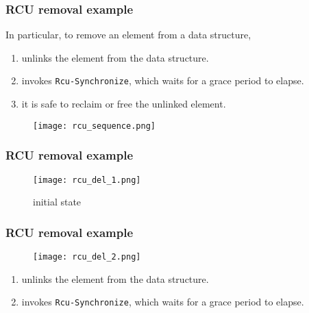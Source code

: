 \documentclass{beamer}
\begin{document}

\begin{frame}[t]
  \frametitle{RCU removal example}
  
  In particular, to remove an element from a data structure,
  \begin{enumerate}
  \item unlinks the element from the data structure.
  \item invokes \texttt{Rcu-Synchronize}, which waits for a grace period to elapse.
  \item it is safe to reclaim or free the unlinked element.
  \end{enumerate}

  \begin{figure}[ht]
    \centering
    \texttt{[image: rcu\_sequence.png]}
  \end{figure}
  
\end{frame}


\begin{frame}[t]
  \frametitle{RCU removal example}

  \begin{figure}[ht]
    \centering
    \texttt{[image: rcu\_del\_1.png]}
    \caption{initial state}
  \end{figure}
  
\end{frame}


\begin{frame}[t]
  \frametitle{RCU removal example}

  \begin{figure}[ht]
    \centering
    \texttt{[image: rcu\_del\_2.png]}
  \end{figure}

  \begin{enumerate}
  \item unlinks the element from the data structure.
  \item invokes \texttt{Rcu-Synchronize}, which waits for a grace period to elapse.
  \end{enumerate}
  
\end{frame}
\end{document}
